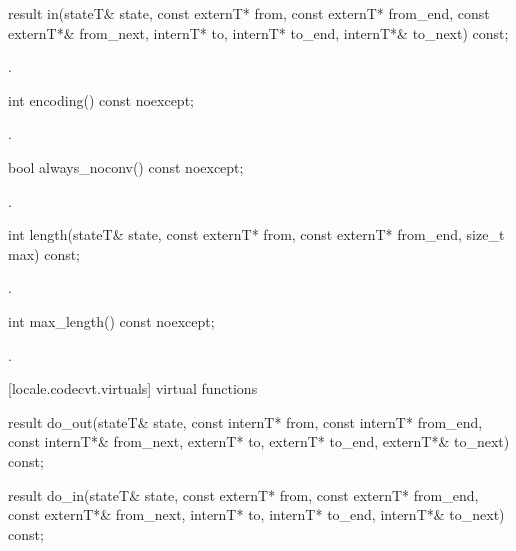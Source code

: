 %
\begin{itemdecl}
result in(stateT& state,
  const externT* from, const externT* from_end, const externT*& from_next,
        internT* to, internT* to_end, internT*& to_next) const;
\end{itemdecl}

\begin{itemdescr}
\pnum
\returns
{}.
\end{itemdescr}

%
\begin{itemdecl}
int encoding() const noexcept;
\end{itemdecl}

\begin{itemdescr}
\pnum
\returns
{}.
\end{itemdescr}

%
\begin{itemdecl}
bool always_noconv() const noexcept;
\end{itemdecl}

\begin{itemdescr}
\pnum
\returns
{}.
\end{itemdescr}

%
\begin{itemdecl}
int length(stateT& state, const externT* from, const externT* from_end,
           size_t max) const;
\end{itemdecl}

\begin{itemdescr}
\pnum
\returns
{}.
\end{itemdescr}

%
\begin{itemdecl}
int max_length() const noexcept;
\end{itemdecl}

\begin{itemdescr}
\pnum
\returns
{}.
\end{itemdescr}

[locale.codecvt.virtuals]{ virtual functions}

%
%
\begin{itemdecl}
result do_out(stateT& state,
  const internT* from, const internT* from_end, const internT*& from_next,
  externT* to, externT* to_end, externT*& to_next) const;

result do_in(stateT& state,
  const externT* from, const externT* from_end, const externT*& from_next,
        internT* to, internT* to_end, internT*& to_next) const;
\end{itemdecl}

